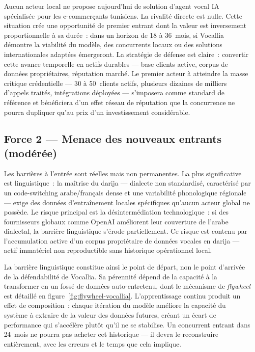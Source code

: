 Aucun acteur local ne propose aujourd'hui de solution d'agent vocal IA spécialisée pour les e-commerçants tunisiens. La rivalité directe est nulle. Cette situation crée une opportunité de premier entrant dont la valeur est inversement proportionnelle à sa durée~: dans un horizon de 18 à 36~mois, si Vocallia démontre la viabilité du modèle, des concurrents locaux ou des solutions internationales adaptées émergeront. La stratégie de défense est claire~: convertir cette avance temporelle en actifs durables --- base clients active, corpus de données propriétaires, réputation marché. Le premier acteur à atteindre la masse critique crédentielle --- 30 à 50~clients actifs, plusieurs dizaines de milliers d'appels traités, intégrations déployées --- s'imposera comme standard de référence et bénéficiera d'un effet réseau de réputation que la concurrence ne pourra dupliquer qu'au prix d'un investissement considérable.

\subsection{Force 2 --- Menace des nouveaux entrants (modérée)}
\label{section2.2.2}

Les barrières à l'entrée sont réelles mais non permanentes. La plus significative est linguistique~: la maîtrise du darija --- dialecte non standardisé, caractérisé par un code-switching arabe/français dense et une variabilité phonologique régionale --- exige des données d'entraînement locales spécifiques qu'aucun acteur global ne possède. Le risque principal est la désintermédiation technologique~: si des fournisseurs globaux comme OpenAI améliorent leur couverture de l'arabe dialectal, la barrière linguistique s'érode partiellement. Ce risque est contenu par l'accumulation active d'un corpus propriétaire de données vocales en darija --- actif immatériel non reproductible sans historique opérationnel local.

La barrière linguistique constitue ainsi le point de départ, non le point d'arrivée de la défendabilité de Vocallia. Sa pérennité dépend de la capacité à la transformer en un fossé de données auto-entretenu, dont le mécanisme de \emph{flywheel} est détaillé en figure~\ref{fig:flywheel-vocallia}. L'apprentissage continu produit un effet de composition~: chaque itération du modèle améliore la capacité du système à extraire de la valeur des données futures, créant un écart de performance qui s'accélère plutôt qu'il ne se stabilise. Un concurrent entrant dans 24~mois ne pourra pas acheter cet historique --- il devra le reconstruire entièrement, avec les erreurs et le temps que cela implique.

